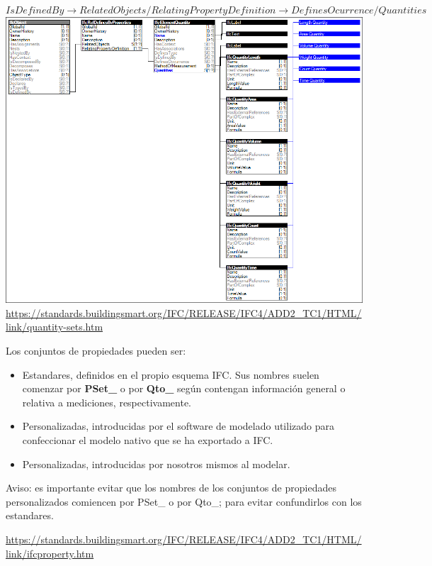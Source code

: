 \documentclass[spanish,10pt,a4paper,final,oneside]{article}
\begin{document}
\newpage
$IsDefinedBy \rightarrow RelatedObjects / RelatingPropertyDefinition \rightarrow DefinesOcurrence / Quantities$
\\ \includegraphics[width=\textwidth]{quantity-sets}
\\ \url{https://standards.buildingsmart.org/IFC/RELEASE/IFC4/ADD2_TC1/HTML/link/quantity-sets.htm}


\vspace{0.5cm}
Los conjuntos de propiedades pueden ser:
\begin{itemize}
\item Estandares, definidos en el propio esquema IFC. Sus nombres suelen comenzar por \textbf{PSet\_} o por \textbf{Qto\_} según contengan información general o relativa a mediciones, respectivamente.
\item Personalizadas, introducidas por el software de modelado utilizado para confeccionar el modelo nativo que se ha exportado a IFC.
\item Personalizadas, introducidas por nosotros mismos al modelar.
\end{itemize}
Aviso: es importante evitar que los nombres de los conjuntos de propiedades personalizados comiencen por PSet\_ o por Qto\_; para evitar confundirlos con los estandares. 

\vspace{0.5cm}
\begin{small}\url{https://standards.buildingsmart.org/IFC/RELEASE/IFC4/ADD2_TC1/HTML/link/ifcproperty.htm}\end{small}
\end{document}

